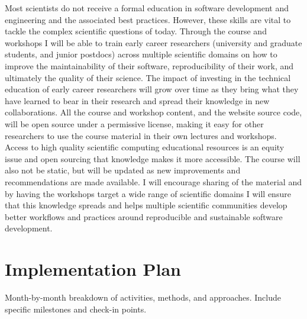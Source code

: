 \documentclass[letterpaper, 11pt]{article}
\begin{document}
Most scientists do not receive a formal education in software development and engineering and the associated best practices.
However, these skills are vital to tackle the complex scientific questions of today.
Through the course and workshops I will be able to train early career researchers (university and graduate students, and junior postdocs) across multiple scientific domains on how to improve the maintainability of their software, reproducibility of their work, and ultimately the quality of their science.
The impact of investing in the technical education of early career researchers will grow over time as they bring what they have learned to bear in their research and spread their knowledge in new collaborations.
All the course and workshop content, and the website source code, will be open source under a permissive license, making it easy for other researchers to use the course material in their own lectures and workshops.
Access to high quality scientific computing educational resources is an equity issue and open sourcing that knowledge makes it more accessible. The course will also not be static, but will be updated as new improvements and recommendations are made available.
I will encourage sharing of the material and by having the workshops target a wide range of scientific domains I will ensure that this knowledge spreads and helps multiple scientific communities develop better workflows and practices around reproducible and sustainable software development.

\section{Implementation Plan}

Month-by-month breakdown of activities, methods, and approaches.
Include specific milestones and check-in points.
\end{document}
